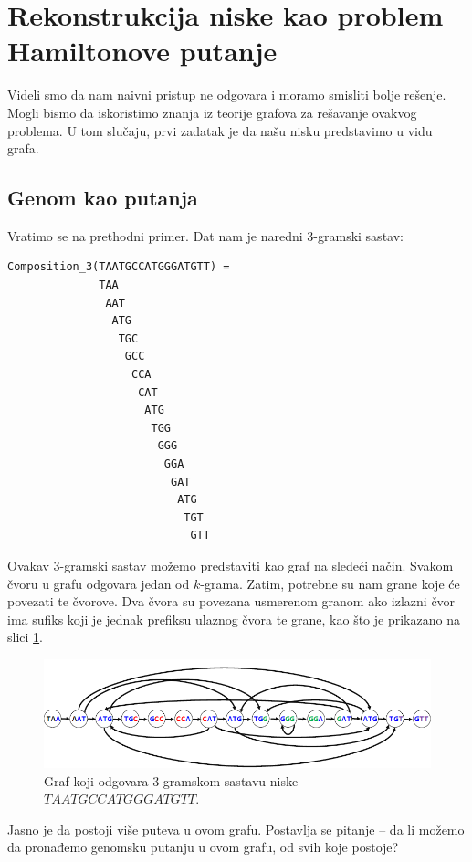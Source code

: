 \section{Rekonstrukcija niske kao problem Hamiltonove putanje}

Videli smo da nam naivni pristup ne odgovara i moramo smisliti bolje rešenje. Mogli bismo da iskoristimo znanja iz teorije grafova za rešavanje ovakvog problema. U tom slučaju, prvi zadatak je da našu nisku predstavimo u vidu grafa.

\subsection{Genom kao putanja}

Vratimo se na prethodni primer. Dat nam je naredni 3-gramski sastav:
\begin{lstlisting}
Composition_3(TAATGCCATGGGATGTT) =
              TAA 
               AAT 
                ATG
                 TGC
                  GCC
                   CCA
                    CAT
                     ATG
                      TGG
                       GGG
                        GGA
                         GAT
                          ATG
                           TGT
                            GTT
\end{lstlisting}

Ovakav 3-gramski sastav mo\v zemo predstaviti kao graf na slede\'ci na\v cin. Svakom \v cvoru u grafu odgovara jedan od $k$-grama. Zatim, potrebne su nam grane koje će povezati te čvorove. Dva čvora su povezana usmerenom granom ako izlazni čvor ima sufiks koji je jednak prefiksu ulaznog čvora te grane, kao što je prikazano na slici \ref{slika:hamilton}.

\begin{figure}[H]
	\centering
	\includegraphics[width=1\textwidth]{poglavlja/3/slike/hamilton.png}
	\caption{Graf koji odgovara 3-gramskom sastavu niske $TAATGCCATGGGATGTT$.}
	\label{slika:hamilton}
\end{figure} 

Jasno je da postoji više puteva u ovom grafu. Postavlja se pitanje -- da li možemo da pronađemo genomsku putanju u ovom grafu, od svih koje postoje?

